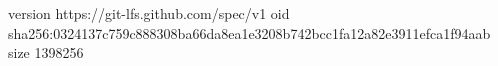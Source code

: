 version https://git-lfs.github.com/spec/v1
oid sha256:0324137c759c888308ba66da8ea1e3208b742bcc1fa12a82e3911efca1f94aab
size 1398256
